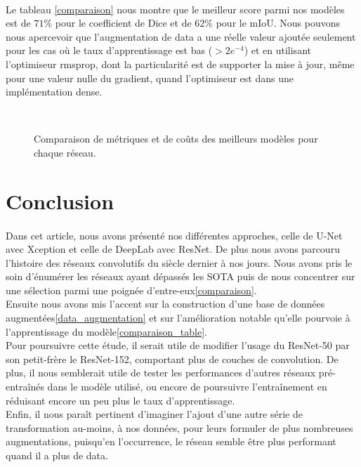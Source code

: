 \documentclass[
10pt, %
a4paper, %
oneside, %
headinclude,footinclude, %
]{scrartcl}
\begin{document}
\paragraph{}Le tableau \ref{comparaison} nous montre que le meilleur score parmi nos modèles est de $71$\% pour le  coefficient de Dice et de $62$\% pour le mIoU. Nous pouvons nous apercevoir que l’augmentation de data a une réelle valeur ajoutée seulement pour les cas où le taux d’apprentissage est bas ($>2e^{-4}$) et en utilisant l’optimiseur rmsprop, dont la particularité est de supporter la mise à jour, même pour une valeur nulle du gradient, quand l’optimiseur est dans une implémentation dense.

\begin{figure}[htb]
\centering
{} \quad
{} \\
 \quad
{}
\caption[Mesure des Performances]{Comparaison de métriques et de coûts des meilleurs modèles pour chaque réseau.} %
\label{fig:comparaison}
\end{figure}

\section{Conclusion}
\paragraph{}Dans cet article, nous avons présenté nos différentes approches, celle de U-Net avec Xception et celle de DeepLab avec ResNet. De plus nous avons parcouru l’histoire des réseaux convolutifs du siècle dernier à nos jours. Nous avons pris le soin d’énumérer les réseaux ayant dépassés les SOTA puis de nous concentrer sur une sélection parmi une poignée d’entre-eux\ref{comparaison}.
\\
Ensuite nous avons mis l’accent sur la construction d’une base de données augmentées\ref{data_augmentation} et sur l’amélioration notable qu’elle pourvoie à l’apprentissage du modèle\ref{comparaison_table}.
\\
Pour poursuivre cette étude, il serait utile de modifier l’usage du ResNet-50 par son petit-frère le ResNet-152, comportant plus de couches de convolution. De plus, il nous semblerait utile de tester les performances d’autres réseaux pré-entraînés dans le modèle utilisé, ou encore de poursuivre l’entraînement en réduisant encore un peu plus le taux d’apprentissage.
\\
Enfin, il nous paraît pertinent d’imaginer l’ajout d’une autre série de transformation au-moins, à nos données, pour leurs formuler de plus nombreuses augmentations, puisqu’en l’occurrence, le réseau semble être plus performant quand il a plus de data.
\end{document}
